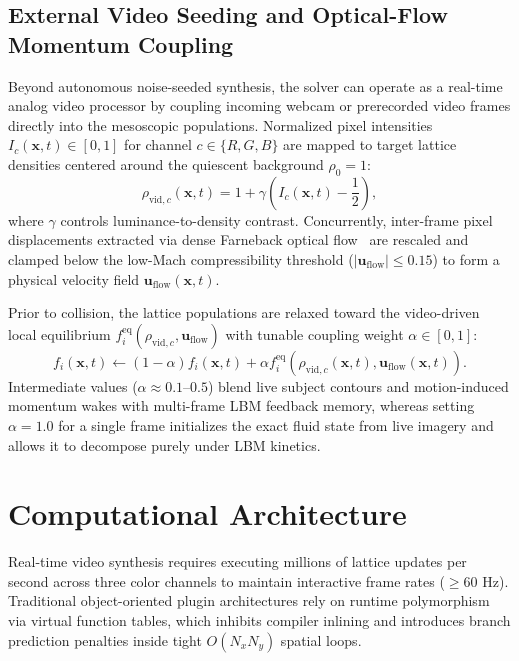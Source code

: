 \documentclass[aps,pre,twocolumn,showpacs,superscriptaddress,floatfix]{revtex4-2}
\begin{document}
\subsection{External Video Seeding and Optical-Flow Momentum Coupling}

Beyond autonomous noise-seeded synthesis, the solver can operate as a real-time analog video processor by coupling incoming webcam or prerecorded video frames directly into the mesoscopic populations. Normalized pixel intensities $I_c(\bm{x}, t) \in [0, 1]$ for channel $c \in \{R, G, B\}$ are mapped to target lattice densities centered around the quiescent background $\rho_0 = 1$:
\begin{equation}
\rho_{\mathrm{vid}, c}(\bm{x}, t) = 1 + \gamma \left( I_c(\bm{x}, t) - \frac{1}{2} \right),
\label{eq:video_density}
\end{equation}
where $\gamma$ controls luminance-to-density contrast. Concurrently, inter-frame pixel displacements extracted via dense Farneback optical flow~\cite{farneback2003} are rescaled and clamped below the low-Mach compressibility threshold ($|\bm{u}_{\mathrm{flow}}| \le 0.15$) to form a physical velocity field $\bm{u}_{\mathrm{flow}}(\bm{x}, t)$.

Prior to collision, the lattice populations are relaxed toward the video-driven local equilibrium $f_i^{\mathrm{eq}}(\rho_{\mathrm{vid}, c}, \bm{u}_{\mathrm{flow}})$ with tunable coupling weight $\alpha \in [0, 1]$:
\begin{equation}
f_i(\bm{x}, t) \leftarrow (1 - \alpha) f_i(\bm{x}, t) + \alpha f_i^{\mathrm{eq}}\left(\rho_{\mathrm{vid}, c}(\bm{x}, t), \bm{u}_{\mathrm{flow}}(\bm{x}, t)\right).
\label{eq:video_equilibrium_blend}
\end{equation}
Intermediate values ($\alpha \approx 0.1\text{--}0.5$) blend live subject contours and motion-induced momentum wakes with multi-frame LBM feedback memory, whereas setting $\alpha = 1.0$ for a single frame initializes the exact fluid state from live imagery and allows it to decompose purely under LBM kinetics.

\section{Computational Architecture}

Real-time video synthesis requires executing millions of lattice updates per second across three color channels to maintain interactive frame rates ($\ge 60\text{ Hz}$). Traditional object-oriented plugin architectures rely on runtime polymorphism via virtual function tables, which inhibits compiler inlining and introduces branch prediction penalties inside tight $O(N_x N_y)$ spatial loops.
\end{document}
